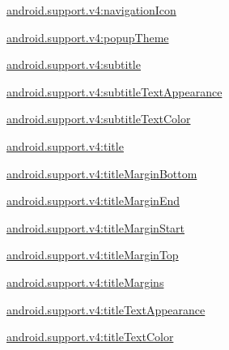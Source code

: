 {\ttfamily \hyperlink{classandroid_1_1support_1_1v4_1_1R_1_1styleable_a661ed648518af5edf2636cb075a4fbbe}{android.\+support.\+v4\+:navigation\+Icon}}

{\ttfamily \hyperlink{classandroid_1_1support_1_1v4_1_1R_1_1styleable_a6383da799d3eb15b2f73a0b40c936a2f}{android.\+support.\+v4\+:popup\+Theme}}

{\ttfamily \hyperlink{classandroid_1_1support_1_1v4_1_1R_1_1styleable_a56f57151a46ae8da5d66cce8444fc7f4}{android.\+support.\+v4\+:subtitle}}

{\ttfamily \hyperlink{classandroid_1_1support_1_1v4_1_1R_1_1styleable_a6575166e631245fde7c74544cb270d07}{android.\+support.\+v4\+:subtitle\+Text\+Appearance}}

{\ttfamily \hyperlink{classandroid_1_1support_1_1v4_1_1R_1_1styleable_ab4fc0b1af097899c23a2cafac5d295c6}{android.\+support.\+v4\+:subtitle\+Text\+Color}}

{\ttfamily \hyperlink{classandroid_1_1support_1_1v4_1_1R_1_1styleable_a028dd183d392a34cc1188283e78f799d}{android.\+support.\+v4\+:title}}

{\ttfamily \hyperlink{classandroid_1_1support_1_1v4_1_1R_1_1styleable_af61d7365bb54301d95ac8b1dbb70d637}{android.\+support.\+v4\+:title\+Margin\+Bottom}}

{\ttfamily \hyperlink{classandroid_1_1support_1_1v4_1_1R_1_1styleable_a372ca0431ab4693a3248600ed75e4c10}{android.\+support.\+v4\+:title\+Margin\+End}}

{\ttfamily \hyperlink{classandroid_1_1support_1_1v4_1_1R_1_1styleable_a879f1e4b1e7a561bfd7bcbcd1d237762}{android.\+support.\+v4\+:title\+Margin\+Start}}

{\ttfamily \hyperlink{classandroid_1_1support_1_1v4_1_1R_1_1styleable_a4d1ca9c426378fcd3df61341e7cd11f1}{android.\+support.\+v4\+:title\+Margin\+Top}}

{\ttfamily \hyperlink{classandroid_1_1support_1_1v4_1_1R_1_1styleable_acb7d5ee2c69e4de526bd73e36e16b455}{android.\+support.\+v4\+:title\+Margins}}

{\ttfamily \hyperlink{classandroid_1_1support_1_1v4_1_1R_1_1styleable_a87e1a78ebc943729c097ee28bda542cd}{android.\+support.\+v4\+:title\+Text\+Appearance}}

{\ttfamily \hyperlink{classandroid_1_1support_1_1v4_1_1R_1_1styleable_a249158d0b5533c28e927718a4311d4fb}{android.\+support.\+v4\+:title\+Text\+Color}}

